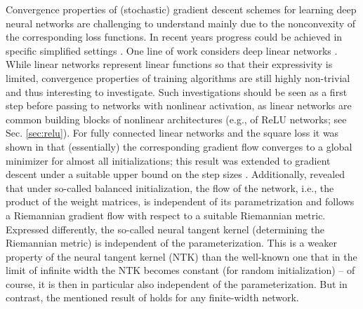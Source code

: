 \documentclass[twoside]{article}
\theoremstyle{definition}
\theoremstyle{remark}
\begin{document}
Convergence properties of (stochastic) gradient descent schemes for learning deep neural networks are challenging to understand mainly due to the nonconvexity of the corresponding loss functions. In recent years progress could be achieved in specific simplified settings 
\cite{arora2018optimization,ntk,bah2022learning,kohn2022geometry}. One line of work considers deep linear  networks \cite{arora2018optimization,bah2022learning,kohn2022geometry,kohn2024function,ngraul24}. While linear  networks represent linear functions so that their expressivity is  limited, convergence properties of training algorithms are still highly non-trivial and thus interesting to investigate. Such investigations should be seen as a first step before passing to networks with nonlinear activation, as linear networks are common building blocks of nonlinear architectures (e.g., of ReLU networks; see Sec. \ref{sec:relu}). For fully connected linear networks and the square loss it was shown in \cite{bah2022learning} that (essentially) the corresponding gradient flow converges to a global minimizer for almost all initializations; this result was extended to gradient descent under a suitable upper bound on the step sizes \cite{ngraul24}. Additionally, \cite{bah2022learning} revealed that under so-called balanced initialization, the flow of the  network, i.e., the product of the weight matrices, is independent of its parametrization and follows a Riemannian gradient flow with respect to a suitable Riemannian metric. Expressed differently, the so-called neural tangent kernel (determining the Riemannian metric) is independent of the parameterization. This is a weaker property of the neural tangent kernel (NTK) than the well-known one that in the limit of infinite width the NTK becomes constant \cite{ntk} (for random initialization) -- of course, it is then in particular also independent of the parameterization. But in contrast, the mentioned result of \cite{arora2018optimization,bah2022learning} holds for any finite-width network.
\end{document}
